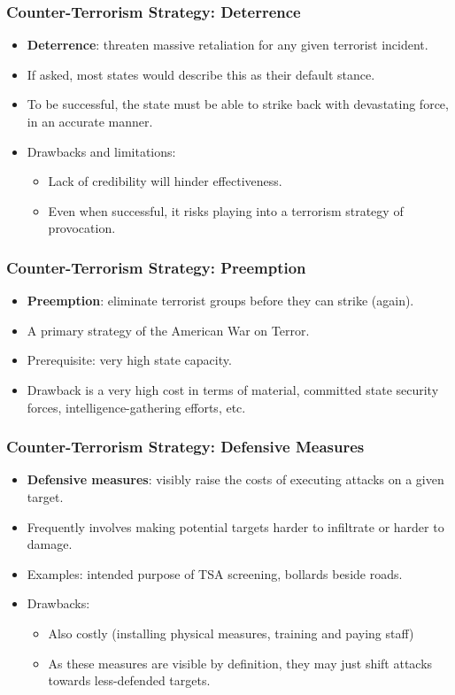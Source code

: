 \documentclass[handout]{beamer}
\begin{document}
\begin{frame} 
\frametitle{\LARGE{Counter-Terrorism Strategy: Deterrence}}
\begin{itemize}
		\item \textbf{Deterrence}: threaten massive retaliation for any given terrorist incident. \pause
		\item If asked, most states would describe this as their default stance. \pause
		\item To be successful, the state must be able to strike back with devastating force, in an accurate manner.
		\item Drawbacks and limitations: \pause
		\begin{itemize}
			\item Lack of credibility will hinder effectiveness. \pause
			\item Even when successful, it risks playing into a terrorism strategy of provocation.
		\end{itemize}
\end{itemize}
\end{frame}

\begin{frame} 
	\frametitle{\LARGE{Counter-Terrorism Strategy: Preemption}}
	\begin{itemize}
		\item \textbf{Preemption}: eliminate terrorist groups before they can strike (again). \pause 
		\item A primary strategy of the American War on Terror.
		\item Prerequisite: very high state capacity. \pause
		\item Drawback is a very high cost in terms of material, committed state security forces, intelligence-gathering efforts, etc.  
	\end{itemize}
\end{frame}

\begin{frame} 
	\frametitle{\LARGE{Counter-Terrorism Strategy: Defensive Measures}}
	\begin{itemize} 
		\item \textbf{Defensive measures}: visibly raise the costs of executing attacks on a given target. \pause
		\item Frequently involves making potential targets harder to infiltrate or harder to damage.
		\item Examples: intended purpose of TSA screening, bollards beside roads.
		\item Drawbacks:
		\begin{itemize}
			\item Also costly (installing physical measures, training and paying staff) \pause
			\item As these measures are visible by definition, they may just shift attacks towards less-defended targets. 
		\end{itemize}
	\end{itemize}
\end{frame}
\end{document}
